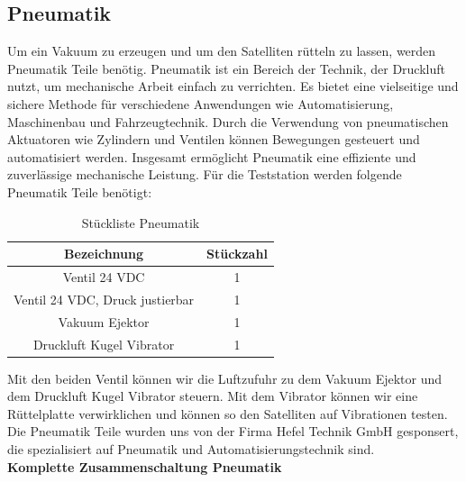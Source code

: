 \subsection{Pneumatik}\label{sec:Pneumatik}
Um ein Vakuum zu erzeugen und um den Satelliten rütteln zu lassen, werden Pneumatik Teile benötig.
Pneumatik ist ein Bereich der Technik, der Druckluft nutzt, um mechanische Arbeit einfach zu verrichten. Es bietet eine vielseitige und sichere Methode für verschiedene Anwendungen wie Automatisierung, Maschinenbau und Fahrzeugtechnik. Durch die Verwendung von pneumatischen Aktuatoren wie Zylindern und Ventilen können Bewegungen gesteuert und automatisiert werden. Insgesamt ermöglicht Pneumatik eine effiziente und zuverlässige mechanische Leistung. Für die Teststation werden folgende Pneumatik Teile benötigt:
\vspace{3mm}
\begin{table}[H]
    \centering
    \begin{tabular}{ | c | c | } 
  \hline
   \textbf{Bezeichnung} & \textbf{Stückzahl}\\ 
  \hline
   Ventil 24 VDC & 1\\ 
  \hline
    Ventil 24 VDC, Druck justierbar & 1 \\ 
  \hline
  Vakuum Ejektor & 1 \\ 
  \hline
  Druckluft Kugel Vibrator & 1 \\ 
  \hline
\end{tabular}
    \caption{Stückliste Pneumatik}
\end{table}
\vspace{2mm}
Mit den beiden Ventil können wir die Luftzufuhr zu dem Vakuum Ejektor und dem Druckluft Kugel Vibrator steuern. Mit dem Vibrator können wir eine Rüttelplatte verwirklichen und können so den Satelliten auf Vibrationen testen. Die Pneumatik Teile wurden uns von der Firma Hefel Technik GmbH gesponsert, die spezialisiert auf Pneumatik und Automatisierungstechnik sind.\\
\newpage
\textbf{Komplette Zusammenschaltung Pneumatik}\\
\vspace{3mm}
